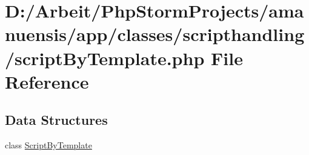 \hypertarget{script_by_template_8php}{}\section{D\+:/\+Arbeit/\+Php\+Storm\+Projects/amanuensis/app/classes/scripthandling/script\+By\+Template.php File Reference}
\label{script_by_template_8php}
\subsection*{Data Structures}
\begin{DoxyCompactItemize}
\item 
class \hyperlink{class_script_by_template}{Script\+By\+Template}
\end{DoxyCompactItemize}
